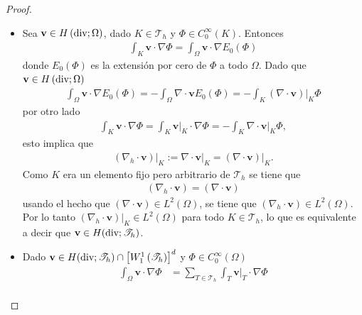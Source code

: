 \documentclass[10pt,a4paper]{report}
\newcommand{\Hdiv}{H\left(\textup{div};\Omega\right)}
\newcommand{\Hdivt}{H(\textup{div};\mathscr{T}_{h})}
\begin{document}
    \begin{proof}
    	\begin{itemize}
    		\item[$(a)$] Sea $\textbf{v}\in \Hdiv$, dado $K\in \mathscr{T}_{h}$ y $\varPhi\in C^{\infty}_{0}(K)$. Entonces 
    		\begin{align*}
    			\int_{K}\textbf{v}\cdot \nabla \varPhi = \int_{\Omega} \textbf{v}\cdot \nabla E_{0}\left(\varPhi\right)
    		\end{align*}
    	    donde $E_{0}\left(\varPhi\right)$ es la extensión por cero de $\varPhi$ a todo $\Omega$. Dado que $\textbf{v}\in \Hdiv$
    	    \begin{align*}
    	    	\int_{\Omega} \textbf{v}\cdot \nabla E_{0}\left(\varPhi\right) = - \int_{\Omega} \nabla\cdot \textbf{v}E_{0}\left(\varPhi\right) = -\int_{K}\left(\nabla\cdot \textbf{v}\right)\vert_{K}\varPhi
    	    \end{align*} 
            por otro lado
            \begin{align*}
            	\int_{K} \textbf{v}\cdot \nabla \varPhi = \int_{K}\textbf{v}\vert_{K}\cdot \nabla\varPhi = -\int_{K} \nabla\cdot \textbf{v}\vert_{K}\varPhi,
            \end{align*}
            esto implica que
            \begin{align*}
            	\left(\nabla_{h}\cdot\textbf{v}\right)\vert_{K} := \nabla\cdot \textbf{v}\vert_{K} =  \left(\nabla\cdot\textbf{v}\right)\vert_{K}.
            \end{align*}
            Como $K$ era un elemento fijo pero arbitrario de $\mathscr{T}_{h}$ se tiene que 
            \begin{align*}
            	\left(\nabla_{h}\cdot\textbf{v}\right) =  \left(\nabla\cdot\textbf{v}\right)
            \end{align*}
            usando el hecho que $\left(\nabla\cdot\textbf{v}\right)\in L^{2}\left(\Omega\right)$, se tiene que $\left(\nabla_{h}\cdot\textbf{v}\right)\in L^{2}\left(\Omega\right)$. Por lo tanto $\left(\nabla_{h}\cdot\textbf{v}\right)\vert_{K}\in L^{2}\left(\Omega\right)$ para todo $K\in \mathscr{T}_{h}$, lo que es equivalente a decir que $\textbf{v}\in \Hdivt$.
            \item[$(b)$] Dado $\textbf{v}\in \Hdivt\cap \left[W^{1}_{1}\left(\mathscr{T}_{h}\right)\right]^{d}$ y $\varPhi\in C^{\infty}_{0}\left(\Omega\right)$
            \begin{align*}
            	\int_{\Omega}\textbf{v}\cdot\nabla\varPhi &= \sum_{T\in\mathscr{T}_{h}}\int_{T}\textbf{v}\vert_{T}\cdot\nabla\varPhi\\ 

\end{align*}
\end{itemize}
\end{proof}
\end{document}

